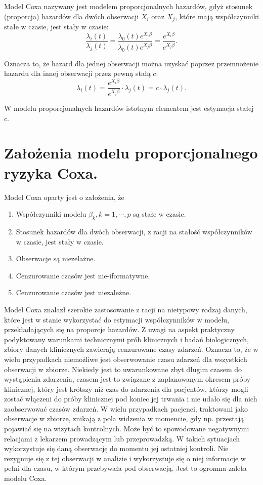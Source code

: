 Model Coxa nazywany jest modelem proporcjonalnych hazardów, gdyż stosunek (proporcja) hazardów dla dwóch obserwacji $X_i$ oraz $X_j$, które mają współczynniki stałe w czasie, jest stały w czasie:  
$$\dfrac{\lambda_i(t)}{\lambda_j(t)} = \dfrac{\lambda_0(t)e^{X_i\beta}}{\lambda_0(t)e^{X_j\beta}} = \dfrac{e^{X_i\beta}}{e^{X_j\beta}}.$$

Oznacza to, że hazard dla jednej obserwacji można uzyskać poprzez przemnożenie hazardu dla innej obserwacji przez pewną stałą $c$:
$$\lambda_i(t) = \dfrac{e^{X_i\beta}}{e^{X_j\beta}} \cdot \lambda_j(t) = c \cdot \lambda_j(t).$$

W modelu proporcjonalnych hazardów istotnym elementem jest estymacja stałej $c$.

\section{Założenia modelu proporcjonalnego ryzyka Coxa.}

Model Coxa oparty jest o założenia, że
\begin{enumerate}
\item Współczynniki modelu $\beta_k, k = 1,\cdots,p$ są stałe w czasie.
\item Stosunek hazardów dla dwóch obserwacji, z racji na stałość współczynników w czasie, jest stały w czasie.
\item Obserwacje są niezelażne.
\item Cenzurowanie czasów jest nie-iformatywne.
\item Cenzurowanie czasów jest niezależne.
\end{enumerate}

Model Coxa znalazł szerokie zastosowanie z racji na nietypowy rodzaj danych, które jest w stanie wykorzystać do estymacji współczynników w modelu, przekładających się na proporcje hazardów. Z uwagi na aspekt praktyczny podyktowany warunkami technicznymi prób klinicznych i badań biologicznych, zbiory danych klinicznych zawierają cenzurowane czasy zdarzeń. Oznacza to, że w wielu przypadkach niemożliwe jest obserwowanie czasu zdarzeń dla wszystkich obserwacji w zbiorze. Niekiedy jest to uwarunkowane zbyt długim czasem do wystąpienia zdarzenia, czasem jest to związane z zaplanowanym okresem próby klinicznej, który jest krótszy niż czas do zdarzenia dla pacjentów, którzy mogli zostać włączeni do próby klinicznej pod koniec jej trwania i nie udało się dla nich zaobserwować czasów zdarzeń. W wielu przypadkach pacjenci, traktowani jako obserwacje w zbiorze, znikają z pola widzenia w momencie, gdy np. przestają pojawiać się na wizytach kontrolnych. Może być to spowodowane negatywnymi relacjami z lekarzem prowadzącym lub przeprowadzką. W takich sytuacjach wykorzystuje się daną obserwację do momentu jej ostatniej kontroli. Nie rezygnuje się z tej obserwacji w analizie i wykorzystuje się o niej informacje w pełni dla czasu, w którym przebywała pod obserwacją. Jest to ogromna zaleta modelu Coxa.

